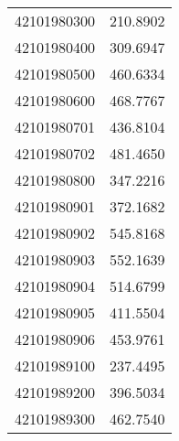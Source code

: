 \begin{longtable}[t]{lr}
42101980300 & 210.8902\\
42101980400 & 309.6947\\
42101980500 & 460.6334\\
42101980600 & 468.7767\\
42101980701 & 436.8104\\
42101980702 & 481.4650\\
42101980800 & 347.2216\\
42101980901 & 372.1682\\
42101980902 & 545.8168\\
42101980903 & 552.1639\\
42101980904 & 514.6799\\
42101980905 & 411.5504\\
42101980906 & 453.9761\\
42101989100 & 237.4495\\
42101989200 & 396.5034\\
42101989300 & 462.7540\\*
\end{longtable}
